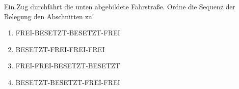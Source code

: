 

Ein Zug durchfährt die unten abgebildete Fahrstraße. Ordne die Sequenz der Belegung den Abschnitten zu!


\begin{enumerate}[label=(\alph*)]
  \item FREI-BESETZT-BESETZT-FREI
  \item BESETZT-FREI-FREI-FREI
  \item FREI-FREI-BESETZT-BESETZT
  \item BESETZT-BESETZT-FREI-FREI
\end{enumerate}